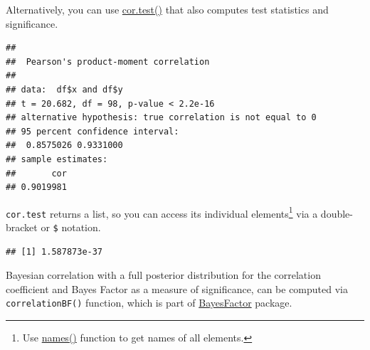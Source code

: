 \documentclass[
]{book}
\newenvironment{Shaded}{\begin{snugshade}}{\end{snugshade}}
\newcommand{\AttributeTok}[1]{\textcolor[rgb]{0.77,0.63,0.00}{#1}}
\newcommand{\FunctionTok}[1]{\textcolor[rgb]{0.00,0.00,0.00}{#1}}
\newcommand{\NormalTok}[1]{#1}
\newcommand{\OtherTok}[1]{\textcolor[rgb]{0.56,0.35,0.01}{#1}}
\newcommand{\SpecialCharTok}[1]{\textcolor[rgb]{0.00,0.00,0.00}{#1}}
\newcommand{\StringTok}[1]{\textcolor[rgb]{0.31,0.60,0.02}{#1}}
\begin{document}
Alternatively, you can use \href{https://stat.ethz.ch/R-manual/R-devel/library/stats/html/cor.test.html}{cor.test()} that also computes test statistics and significance.

\begin{Shaded}
\end{Shaded}

\begin{verbatim}
## 
##  Pearson's product-moment correlation
## 
## data:  df$x and df$y
## t = 20.682, df = 98, p-value < 2.2e-16
## alternative hypothesis: true correlation is not equal to 0
## 95 percent confidence interval:
##  0.8575026 0.9331000
## sample estimates:
##       cor 
## 0.9019981
\end{verbatim}

\texttt{cor.test} returns a list, so you can access its individual elements\footnote{Use \href{https://stat.ethz.ch/R-manual/R-devel/library/base/html/names.html}{names()} function to get names of all elements.} via a double-bracket or \texttt{\$} notation.

\begin{Shaded}
\end{Shaded}

\begin{verbatim}
## [1] 1.587873e-37
\end{verbatim}

Bayesian correlation with a full posterior distribution for the correlation coefficient and Bayes Factor as a measure of significance, can be computed via \texttt{correlationBF()} function, which is part of \href{https://richarddmorey.github.io/BayesFactor}{BayesFactor} package.

\begin{Shaded}
\end{Shaded}
\end{document}
